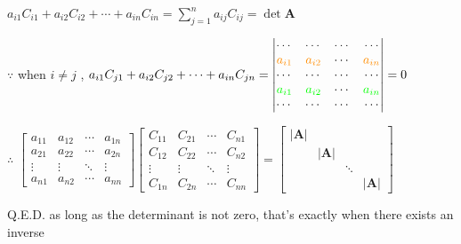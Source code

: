 \documentclass[12pt, a4paper]{article}
\begin{document}
{\begin{math}
	a_{i1}C_{i1} + a_{i2}C_{i2} + \cdots + a_{in}C_{in} = \sum\limits_{j=1}^{n}a_{ij}C_{ij} = {\det{\mathbf{A}}}
\end{math}
\par $\because$ when $i \neq j$ , 
\begin{math}
	a_{i1}C_{j1} + a_{i2}C_{j2} + \cdots + a_{in}C_{jn} = 
	\begin{vmatrix}
		\cdots & \cdots & \cdots & \cdots \\
		{\textcolor{anhao-orange}{a_{i1}}} & {\textcolor{anhao-orange}{a_{i2}}} & \cdots & {\textcolor{anhao-orange}{a_{in}}} \\
		\cdots & \cdots & \cdots & \cdots \\
		{\textcolor{green}{a_{i1}}} & {\textcolor{green}{a_{i2}}} & \cdots & {\textcolor{green}{a_{in}}} \\
		\cdots & \cdots & \cdots & \cdots 
	\end{vmatrix}
	 = 
	0
\end{math}
\par $\therefore$
\begin{math}
	\begin{bmatrix}
		a_{11} & a_{12} & \cdots & a_{1n} \\
		a_{21} & a_{22} & \cdots & a_{2n} \\
		\vdots & \vdots & \ddots & \vdots \\
		a_{n1} & a_{n2} & \cdots & a_{nn} 
	\end{bmatrix}
	\begin{bmatrix}
		C_{11} & C_{21} & \cdots & C_{n1} \\
		C_{12} & C_{22} & \cdots & C_{n2} \\
		\vdots & \vdots & \ddots & \vdots \\
		C_{1n} & C_{2n} & \cdots & C_{nn} 
	\end{bmatrix}
	 = 
	\begin{bmatrix}
		\left|{\mathbf{A}}\right| & \ & \ & \ \\
		\ & \left|{\mathbf{A}}\right| & \ & \ \\
		\ & \ & \ddots & \ \\
		\ & \ & \ & \left|{\mathbf{A}}\right| 
	\end{bmatrix}
\end{math}
\par Q.E.D.
\vspace{14pt}
\newline
{\textcolor{anhao-scarlet}{as long as the determinant is not zero, that's exactly when there exists an inverse}}
}
\end{document}
